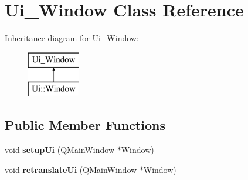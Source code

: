 \hypertarget{class_ui___window}{}\section{Ui\+\_\+\+Window Class Reference}
\label{class_ui___window}
Inheritance diagram for Ui\+\_\+\+Window\+:\begin{figure}[H]
\begin{center}
\leavevmode
\includegraphics[height=2.000000cm]{class_ui___window}
\end{center}
\end{figure}
\subsection*{Public Member Functions}
\begin{DoxyCompactItemize}
\item 
\hypertarget{class_ui___window_a4b24c1d4c30a70b18fac50e906bacc79}{}void {\bfseries setup\+Ui} (Q\+Main\+Window $\ast$\hyperlink{class_window}{Window})\label{class_ui___window_a4b24c1d4c30a70b18fac50e906bacc79}

\item 
\hypertarget{class_ui___window_a40ce2989ba4cb35f824fa69735784d5c}{}void {\bfseries retranslate\+Ui} (Q\+Main\+Window $\ast$\hyperlink{class_window}{Window})\label{class_ui___window_a40ce2989ba4cb35f824fa69735784d5c}

\end{DoxyCompactItemize}

